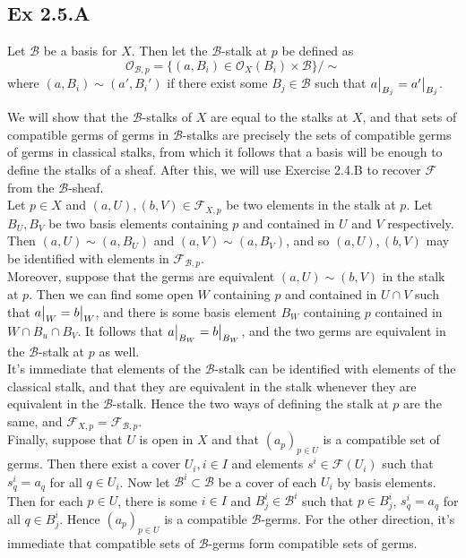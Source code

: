 \documentclass{article}
\newcommand\restr[2]{{%
  \left.\kern-\nulldelimiterspace %
  #1 %
  \vphantom{\big|} %
  \right|_{#2} %
  }}
\theoremstyle{definition}
\begin{document}
\subsection*{Ex 2.5.A}

Let $\mathcal{B}$ be a basis for $X$. Then let the $\mathcal{B}$-stalk at $p$
be defined as
\[
	\mathcal{O}_{\mathcal{B}, p}
	=
	\{
	(a, B_i) \in
	\mathcal{O}_X(B_i) \times \mathcal{B}
	\}
	/ \sim
\]
where $(a, B_i) \sim (a', B_i')$ if there exist some $B_j \in \mathcal{B}$ such
that $\restr{a}{B_j} = \restr{a'}{B_j}$.

We will show that the $\mathcal{B}$-stalks of $X$ are equal to the stalks at
$X$, and that sets of compatible germs of germs in $\mathcal{B}$-stalks are
precisely the sets of compatible germs of germs in classical stalks, from which
it follows that a basis will be enough to define the stalks of a sheaf. After
this, we will use Exercise 2.4.B to recover $\mathcal{F}$ from the
$\mathcal{B}$-sheaf. \\

Let $p \in X$ and $(a, U), (b, V) \in \mathcal{F}_{X, p}$ be two elements in
the stalk at $p$. Let $B_U, B_V$ be two basis elements containing $p$ and
contained in $U$ and $V$ respectively. Then $(a, U) \sim (a, B_U)$ and $(a, V)
	\sim (a, B_V)$, and so $(a, U), (b, V)$ may be identified with elements in
$\mathcal{F}_{\mathcal{B}, p}$. \\

Moreover, suppose that the germs are equivalent $(a, U) \sim (b, V)$ in the
stalk at $p$. Then we can find some open $W$ containing $p$ and contained in $U
	\cap V$ such that $\restr{a}{W} = \restr{b}{W}$, and there is some basis
element $B_W$ containing $p$ contained in $W \cap B_u \cap B_V$. It follows
that $\restr{a}{B_W} = \restr{b}{B_W}$, and the two germs are equivalent in the
$\mathcal{B}$-stalk at $p$ as well. \\

It's immediate that elements of the $\mathcal{B}$-stalk can be identified with
elements of the classical stalk, and that they are equivalent in the stalk
whenever they are equivalent in the $\mathcal{B}$-stalk. Hence the two ways of
defining the stalk at $p$ are the same, and $\mathcal{F}_{X, p} =
	\mathcal{F}_{\mathcal{B}, p}$. \\

Finally, suppose that $U$ is open in $X$ and that $(a_p)_{p \in U}$ is a
compatible set of germs. Then there exist a cover $U_i, i \in I$ and elements
$s^i \in \mathcal{F}(U_i)$ such that $s^i_q = a_q$ for all $q \in U_i$. Now let
$\mathcal{B}^{i} \subset \mathcal{B}$ be a cover of each $U_i$ by basis
elements. Then for each $p \in U$, there is some $i \in I$ and $B_{j}^{i} \in
	\mathcal{B}^{i}$ such that $p \in B_j^{i}$, $s^i_{q} = a_q$ for all $q \in
	B_j^{i}$. Hence $(a_p)_{p \in U}$ is a compatible $\mathcal{B}$-germs. For the
other direction, it's immediate that compatible sets of $\mathcal{B}$-germs
form compatible sets of germs. \\
\end{document}
